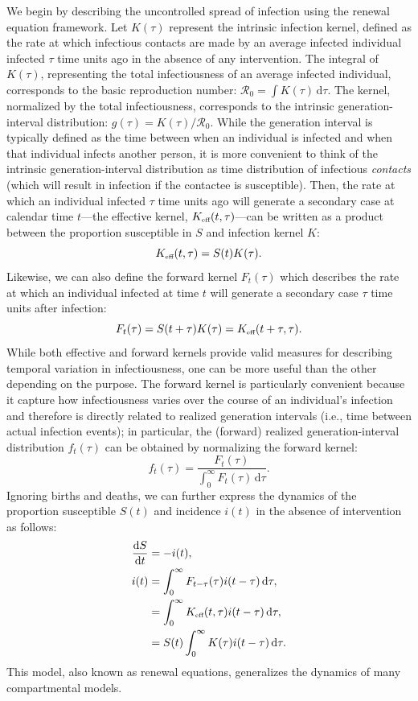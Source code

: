 \documentclass[12pt]{article}
\newcommand{\Rx}[1]{\ensuremath{{\mathcal R}_{#1}}\xspace}
\newcommand{\Ro}{\Rx{0}}
\newcommand{\tsub}[2]{#1_{{\textrm{\tiny #2}}}}
\newcommand{\dd}[1]{\ensuremath{\, \mathrm{d}#1}}
\newcommand{\dtau}{\dd{\tau}}
\newcommand{\Keff}{\ensuremath{\tsub{K}{eff}}\xspace}
\begin{document}
We begin by describing the uncontrolled spread of infection using the renewal equation framework.
Let $K(\tau)$ represent the intrinsic infection kernel, defined as the rate at which infectious contacts are made by an average infected individual infected $\tau$ time units ago in the absence of any intervention.
The integral of $K(\tau)$, representing the total infectiousness of an average infected individual, corresponds to the basic reproduction number: $\Ro = \int K(\tau) \dtau$.
The kernel, normalized by the total infectiousness, corresponds to the intrinsic generation-interval distribution: $g(\tau) = K(\tau)/\Ro$.
While the generation interval is typically defined as the time between when an individual is infected and when that individual infects another person, it is more convenient to think of the intrinsic generation-interval distribution as time distribution of infectious \emph{contacts} (which will result in infection if the contactee is susceptible).
Then, the rate at which an individual infected $\tau$ time units ago will generate a secondary case at calendar time $t$---the effective kernel, $\Keff(t,\tau)$---can be written as a product between the proportion susceptible in $S$ and infection kernel $K$:
\begin{equation}
\Keff(t,\tau) = S(t) K(\tau).
\end{equation}
Likewise, we can also define the forward kernel $F_t(\tau)$ which describes the rate at which an individual infected at time $t$ will generate a secondary case $\tau$ time units after infection:
\begin{equation}
F_t(\tau) = S(t+\tau) K(\tau) = \Keff(t+\tau,\tau).
\end{equation}
While both effective and forward kernels provide valid measures for describing temporal variation in infectiousness, one can be more useful than the other depending on the purpose.
The forward kernel is particularly convenient because it capture how infectiousness varies over the course of an individual's infection and therefore is directly related to realized generation intervals (i.e., time between actual infection events);
in particular, the (forward) realized generation-interval distribution $f_t(\tau)$ can be obtained by normalizing the forward kernel:
\begin{equation}
f_t(\tau) = \frac{F_t(\tau)}{\int_0^\infty F_t(\tau) \dtau}.
\end{equation}
Ignoring births and deaths, we can further express the dynamics of the proportion susceptible $S(t)$ and incidence $i(t)$ in the absence of intervention as follows:
\begin{align}
\frac{\mathrm{d}S}{\mathrm{d}t} &= - i(t),\\
i(t) &= \int_0^\infty F_{t-\tau}(\tau) i(t-\tau) \dtau,\\
&=\int_0^\infty \Keff(t,\tau) i(t-\tau) \dtau,\\
&= S(t) \int_0^\infty K(\tau) i(t-\tau) \dtau.
\end{align}
This model, also known as renewal equations, generalizes the dynamics of many compartmental models.
\end{document}
